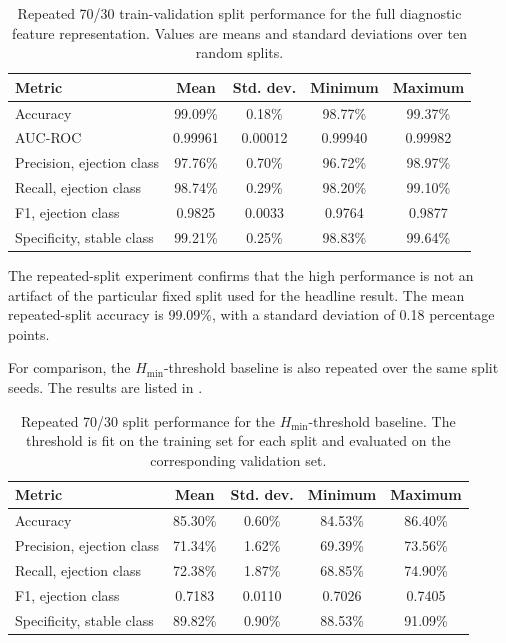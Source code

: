 \documentclass[12pt,a4paper]{article}
\newcommand{\Hmin}{H_{\min}}
\begin{document}
\begin{table}[H]
\centering
\caption{Repeated 70/30 train-validation split performance for the full diagnostic feature representation. Values are means and standard deviations over ten random splits.}
\label{tab:repeated_split_summary}
\begin{tabular}{lcccc}
\toprule
Metric & Mean & Std. dev. & Minimum & Maximum \\
\midrule
Accuracy & 99.09\% & 0.18\% & 98.77\% & 99.37\% \\
AUC-ROC & 0.99961 & 0.00012 & 0.99940 & 0.99982 \\
Precision, ejection class & 97.76\% & 0.70\% & 96.72\% & 98.97\% \\
Recall, ejection class & 98.74\% & 0.29\% & 98.20\% & 99.10\% \\
F1, ejection class & 0.9825 & 0.0033 & 0.9764 & 0.9877 \\
Specificity, stable class & 99.21\% & 0.25\% & 98.83\% & 99.64\% \\
\bottomrule
\end{tabular}
\end{table}

The repeated-split experiment confirms that the high performance is not an artifact of the particular fixed split used for the headline result. The mean repeated-split accuracy is 99.09\%, with a standard deviation of 0.18 percentage points.

For comparison, the \(\Hmin\)-threshold baseline is also repeated over the same split seeds. The results are listed in .

\begin{table}[H]
\centering
\caption{Repeated 70/30 split performance for the \(\Hmin\)-threshold baseline. The threshold is fit on the training set for each split and evaluated on the corresponding validation set.}
\label{tab:hmin_repeated_summary}
\begin{tabular}{lcccc}
\toprule
Metric & Mean & Std. dev. & Minimum & Maximum \\
\midrule
Accuracy & 85.30\% & 0.60\% & 84.53\% & 86.40\% \\
Precision, ejection class & 71.34\% & 1.62\% & 69.39\% & 73.56\% \\
Recall, ejection class & 72.38\% & 1.87\% & 68.85\% & 74.90\% \\
F1, ejection class & 0.7183 & 0.0110 & 0.7026 & 0.7405 \\
Specificity, stable class & 89.82\% & 0.90\% & 88.53\% & 91.09\% \\
\bottomrule
\end{tabular}
\end{table}
\end{document}
